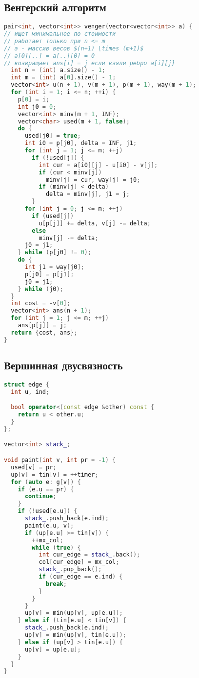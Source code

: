 \documentclass[9pt,a4paper,landscape,twosided]{extarticle}
\begin{document}
\begin{multicols*}{3}
\subsection{Венгерский алгоритм}
\begin{lstlisting}[language=C++]
pair<int, vector<int>> venger(vector<vector<int>> a) {
// ищет минимальное по стоимости
// работает только при n <= m
// a - массив весов $(n+1) \times (m+1)$
// a[0][..] = a[..][0] = 0
// возвращает ans[i] = j если взяли ребро a[i][j]
  int n = (int) a.size() - 1;
  int m = (int) a[0].size() - 1;
  vector<int> u(n + 1), v(m + 1), p(m + 1), way(m + 1);
  for (int i = 1; i <= n; ++i) {
    p[0] = i;
    int j0 = 0;
    vector<int> minv(m + 1, INF);
    vector<char> used(m + 1, false);
    do {
      used[j0] = true;
      int i0 = p[j0], delta = INF, j1;
      for (int j = 1; j <= m; ++j)
        if (!used[j]) {
          int cur = a[i0][j] - u[i0] - v[j];
          if (cur < minv[j])
            minv[j] = cur, way[j] = j0;
          if (minv[j] < delta)
            delta = minv[j], j1 = j;
        }
      for (int j = 0; j <= m; ++j)
        if (used[j])
          u[p[j]] += delta, v[j] -= delta;
        else
          minv[j] -= delta;
      j0 = j1;
    } while (p[j0] != 0);
    do {
      int j1 = way[j0];
      p[j0] = p[j1];
      j0 = j1;
    } while (j0);
  }
  int cost = -v[0];
  vector<int> ans(n + 1);
  for (int j = 1; j <= m; ++j)
    ans[p[j]] = j;
  return {cost, ans};
}
\end{lstlisting}

\subsection{Вершинная двусвязность}
\begin{lstlisting}[language=C++]
struct edge {
  int u, ind;

  bool operator<(const edge &other) const {
    return u < other.u;
  }
};

vector<int> stack_;

void paint(int v, int pr = -1) {
  used[v] = pr;
  up[v] = tin[v] = ++timer;
  for (auto e: g[v]) {
    if (e.u == pr) {
      continue;
    }
    if (!used[e.u]) {
      stack_.push_back(e.ind);
      paint(e.u, v);
      if (up[e.u] >= tin[v]) {
        ++mx_col;
        while (true) {
          int cur_edge = stack_.back();
          col[cur_edge] = mx_col;
          stack_.pop_back();
          if (cur_edge == e.ind) {
            break;
          }
        }
      }
      up[v] = min(up[v], up[e.u]);
    } else if (tin[e.u] < tin[v]) {
      stack_.push_back(e.ind);
      up[v] = min(up[v], tin[e.u]);
    } else if (up[v] > tin[e.u]) {
      up[v] = up[e.u];
    }
  }
}


\end{lstlisting}
\end{multicols*}
\end{document}
